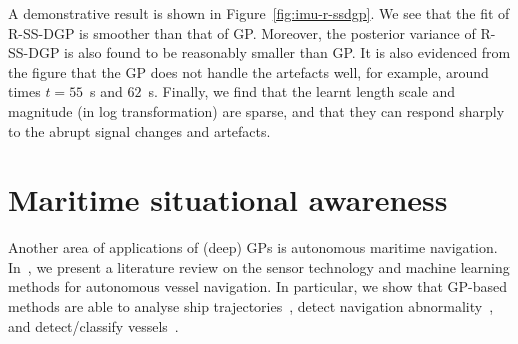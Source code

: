 A demonstrative result is shown in Figure~\ref{fig:imu-r-ssdgp}. We see that the fit of R-SS-DGP is smoother than that of GP. Moreover, the posterior variance of R-SS-DGP is also found to be reasonably smaller than GP. It is also evidenced from the figure that the GP does not handle the artefacts well, for example, around times $t=55$~s and $62$~s. Finally, we find that the learnt length scale and magnitude (in log transformation) are sparse, and that they can respond sharply to the abrupt signal changes and artefacts.

\section{Maritime situational awareness}
\label{sec:maritime}
Another area of applications of (deep) GPs is  autonomous maritime navigation. In~\citet{Sarang2020}, we present a literature review on the sensor technology and machine learning methods for autonomous vessel navigation. In particular, we show that GP-based methods are able to analyse ship trajectories~\citep{Rong2019}, detect navigation abnormality~\citep{Kowalska2012, Smith2014}, and detect/classify vessels~\citep{XiaoZ2017}.

